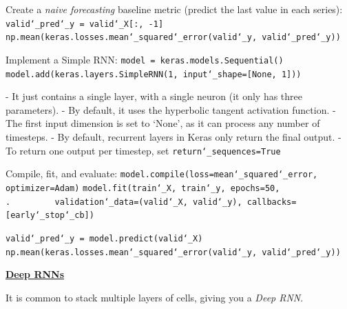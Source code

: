 Create a \textit{naive forecasting} baseline metric (predict the last value in each series):\newline
\texttt{valid\char`_pred\char`_y = valid\char`_X[:, -1]}\newline
\texttt{np.mean(keras.losses.mean\char`_squared\char`_error(valid\char`_y, valid\char`_pred\char`_y))}\newline\newline

Implement a Simple RNN:\newline
\texttt{model = keras.models.Sequential()}\newline
\texttt{model.add(keras.layers.SimpleRNN(1, input\char`_shape=[None, 1]))}

- It just contains a single layer, with a single neuron (it only has three parameters).\newline
- By default, it uses the hyperbolic tangent activation function.\newline
- The first input dimension is set to `None', as it can process any number of timesteps.\newline
- By default, recurrent layers in Keras only return the final output.\newline
- To return one output per timestep, set \texttt{return\char`_sequences=True}\newline

Compile, fit, and evaluate:\newline
\texttt{model.compile(loss=\textquotesingle mean\char`_squared\char`_error\textquotesingle, optimizer=\textquotesingle Adam\textquotesingle)}\newline
\texttt{model.fit(train\char`_X, train\char`_y, epochs=50,\newline
.~~~~~~~~~validation\char`_data=(valid\char`_X, valid\char`_y), callbacks=[early\char`_stop\char`_cb])}

\texttt{valid\char`_pred\char`_y = model.predict(valid\char`_X)}\newline
\texttt{np.mean(keras.losses.mean\char`_squared\char`_error(valid\char`_y, valid\char`_pred\char`_y))}

\newpage
\textbf{\underline{Deep RNNs}}

It is common to stack multiple layers of cells, giving you a \textit{Deep RNN}.\newline

